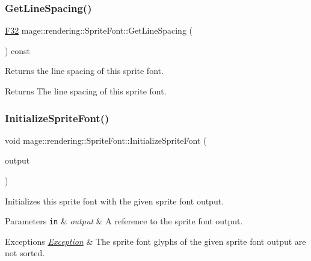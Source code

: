 \subsubsection{\texorpdfstring{Get\+Line\+Spacing()}{GetLineSpacing()}}
{\footnotesize\ttfamily \mbox{\hyperlink{namespacemage_aa97e833b45f06d60a0a9c4fc22ae02c0}{F32}} mage\+::rendering\+::\+Sprite\+Font\+::\+Get\+Line\+Spacing (\begin{DoxyParamCaption}{ }\end{DoxyParamCaption}) const\hspace{0.3cm}{\ttfamily [noexcept]}}

Returns the line spacing of this sprite font.

\begin{DoxyReturn}{Returns}
The line spacing of this sprite font. 
\end{DoxyReturn}
\mbox{\label{classmage_1_1rendering_1_1_sprite_font_a832f140b987c30ef8f6a3b95afe52711}} 
\subsubsection{\texorpdfstring{Initialize\+Sprite\+Font()}{InitializeSpriteFont()}}
{\footnotesize\ttfamily void mage\+::rendering\+::\+Sprite\+Font\+::\+Initialize\+Sprite\+Font (\begin{DoxyParamCaption}\item[{const \mbox{\hyperlink{structmage_1_1rendering_1_1_sprite_font_output}{Sprite\+Font\+Output}} \&}]{output }\end{DoxyParamCaption})\hspace{0.3cm}{\ttfamily [private]}}

Initializes this sprite font with the given sprite font output.


\begin{DoxyParams}[1]{Parameters}
\mbox{\tt in}  & {\em output} & A reference to the sprite font output. \\
\hline
\end{DoxyParams}

\begin{DoxyExceptions}{Exceptions}
{\em \mbox{\hyperlink{classmage_1_1_exception}{Exception}}} & The sprite font glyphs of the given sprite font output are not sorted. \\
\hline
\end{DoxyExceptions}
\mbox{\label{classmage_1_1rendering_1_1_sprite_font_a661820d3d7b20a797966007cd712a76b}} 
